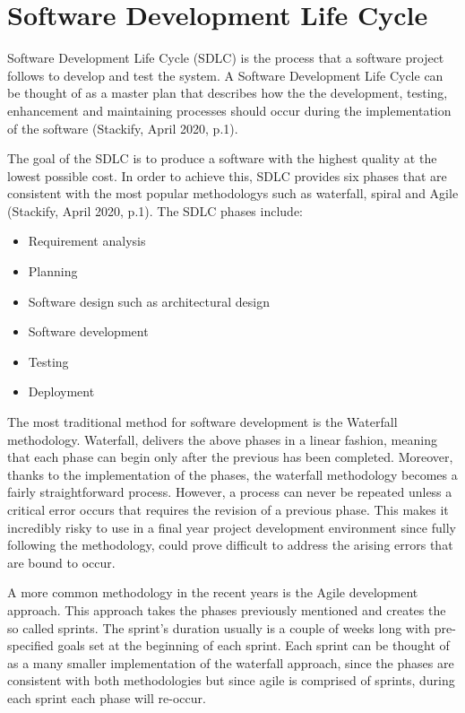 \section{Software Development Life Cycle}
Software Development Life Cycle (SDLC) is the process that a software project follows to develop and test the system. A Software Development Life Cycle can be thought of as a master plan that describes how the the development, testing, enhancement and maintaining processes should occur during the implementation of the software (Stackify, April 2020, p.1).

The goal of the SDLC is to produce a software with the highest quality at the lowest possible cost. In order to achieve this, SDLC provides six phases that are consistent with the most popular methodologys such as waterfall, spiral and Agile (Stackify, April 2020, p.1).
The SDLC phases include:
\begin{itemize}
  \item Requirement analysis
  \item Planning
  \item Software design such as architectural design
  \item Software development
  \item Testing
  \item Deployment
\end{itemize}

The most traditional method for software development is the Waterfall methodology. Waterfall, delivers the above phases in a linear fashion, meaning that each phase can begin only after the previous has been completed. Moreover, thanks to the implementation of the phases, the waterfall methodology becomes a fairly straightforward process. However, a process can never be repeated unless a critical error occurs that requires the revision of a previous phase. This makes it incredibly risky to use in a final year project development environment since fully following the methodology, could prove difficult to address the arising errors that are bound to occur.

A more common methodology in the recent years is the Agile development approach. This approach takes the phases previously mentioned and creates the so called sprints. The sprint's duration usually is a couple of weeks long with pre-specified goals set at the beginning of each sprint. Each sprint can be thought of as a many smaller implementation of the waterfall approach, since the phases are consistent with both methodologies but since agile is comprised of sprints, during each sprint each phase will re-occur.

